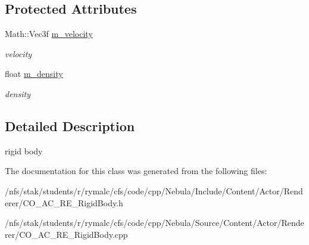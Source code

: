 \subsection*{Protected Attributes}
\begin{DoxyCompactItemize}
\item 
\hypertarget{classContent_1_1Actor_1_1Renderer_1_1RigidBody_add558b7d970b41263622df78cd4094df}{
Math::Vec3f \hyperlink{classContent_1_1Actor_1_1Renderer_1_1RigidBody_add558b7d970b41263622df78cd4094df}{m\_\-velocity}}
\label{classContent_1_1Actor_1_1Renderer_1_1RigidBody_add558b7d970b41263622df78cd4094df}

\begin{DoxyCompactList}\small\item\em velocity \item\end{DoxyCompactList}\item 
\hypertarget{classContent_1_1Actor_1_1Renderer_1_1RigidBody_a54768b223cc4b7d41d1a875d517cdc01}{
float \hyperlink{classContent_1_1Actor_1_1Renderer_1_1RigidBody_a54768b223cc4b7d41d1a875d517cdc01}{m\_\-density}}
\label{classContent_1_1Actor_1_1Renderer_1_1RigidBody_a54768b223cc4b7d41d1a875d517cdc01}

\begin{DoxyCompactList}\small\item\em density \item\end{DoxyCompactList}\end{DoxyCompactItemize}


\subsection{Detailed Description}
rigid body 

The documentation for this class was generated from the following files:\begin{DoxyCompactItemize}
\item 
/nfs/stak/students/r/rymalc/cfs/code/cpp/Nebula/Include/Content/Actor/Renderer/CO\_\-AC\_\-RE\_\-RigidBody.h\item 
/nfs/stak/students/r/rymalc/cfs/code/cpp/Nebula/Source/Content/Actor/Renderer/CO\_\-AC\_\-RE\_\-RigidBody.cpp\end{DoxyCompactItemize}

